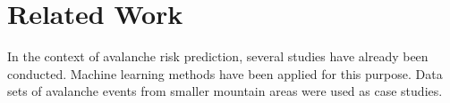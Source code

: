 \documentclass[../masterarbeit.tex]{subfiles}
\begin{document}
	























\section{Related Work}
In the context of avalanche risk prediction, several studies have already been conducted. Machine learning methods have been applied for this purpose. Data sets of avalanche events from smaller mountain areas were used as case studies. 
\end{document}
